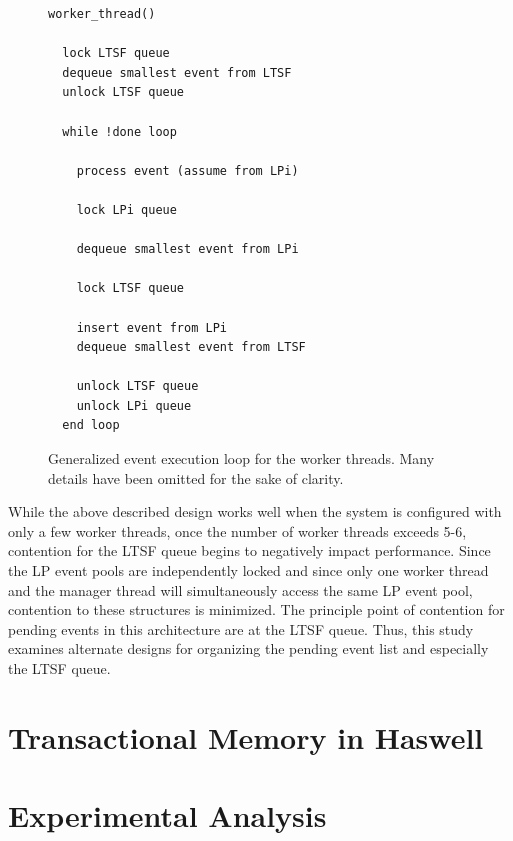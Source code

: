 \documentclass{sig-alternate}
\begin{document}
\begin{figure}

\begin{verbatim}
worker_thread()

  lock LTSF queue
  dequeue smallest event from LTSF
  unlock LTSF queue

  while !done loop

    process event (assume from LPi)

    lock LPi queue 

    dequeue smallest event from LPi

    lock LTSF queue

    insert event from LPi
    dequeue smallest event from LTSF

    unlock LTSF queue
    unlock LPi queue
  end loop
\end{verbatim}

\caption{Generalized event execution loop for the worker threads.  Many details
  have been omitted for the sake of clarity.}\label{workerThreadAlgorithm}

\end{figure}

While the above described design works well when the system is configured with
only a few worker threads, once the number of worker threads exceeds 5-6,
contention for the LTSF queue begins to negatively impact performance.  Since
the LP event pools are independently locked and since only one worker thread and
the manager thread will simultaneously access the same LP event pool, contention
to these structures is minimized.  The principle point of contention for pending
events in this architecture are at the LTSF queue.  Thus, this study examines
alternate designs for organizing the pending event list and especially the LTSF
queue.

\section{Transactional Memory in Haswell}\label{haswell}


\section{Experimental Analysis}\label{experiments}

\end{document}
